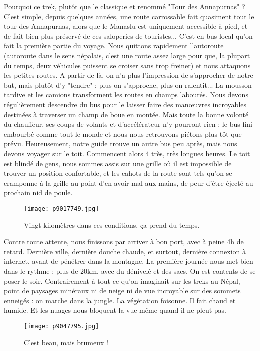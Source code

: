 \documentclass{book}
\begin{document}
Pourquoi ce trek, plutôt que le classique et renommé "Tour des Annapurnas" ? C'est simple, depuis quelques années, une route carrossable fait quasiment tout le tour des Annapurnas, alors que le Manaslu est uniquement accessible à pied, et de fait bien plus préservé de ces saloperies de touristes... C'est en bus local qu'on fait la première partie du voyage. Nous quittons rapidement l'autoroute (autoroute dans le sens népalais, c'est une route assez large pour que, la plupart du temps, deux véhicules puissent se croiser sans trop freiner) et nous attaquons les petites routes. A partir de là, on n'a plus l'impression de s'approcher de notre but, mais plutôt d'y "tendre" : plus on s'approche, plus on ralentit... La mousson tardive et les camions transforment les routes en champs labourés. Nous devons régulièrement descendre du bus pour le laisser faire des manœuvres incroyables destinées à traverser un champ de boue en montée. Mais toute la bonne volonté du chauffeur, ses coups de volants et d'accélérateur n'y pourront rien : le bus fini embourbé comme tout le monde et nous nous retrouvons piétons plus tôt que prévu. Heureusement, notre guide trouve un autre bus peu après, mais nous devons voyager sur le toit. Commencent alors 4 très, très longues heures. Le toit est blindé de gens, nous sommes assis sur une grille où il est impossible de trouver un position confortable, et les cahots de la route sont tels qu'on se cramponne à la grille au point d'en avoir mal aux mains, de peur d'être éjecté au prochain nid de poule.


\begin{figure}[h]
\centering
\texttt{[image: p9017749.jpg]}
\caption*{Vingt kilomètres dans ces conditions, ça prend du temps.}
\end{figure}

Contre toute attente, nous finissons par arriver à bon port, avec à peine 4h de retard. Dernière ville, dernière douche chaude, et surtout, dernière connexion à internet, avant de pénétrer dans la montagne. La première journée nous met bien dans le rythme : plus de 20km, avec du dénivelé et des sacs. On est contents de se poser le soir. Contrairement à tout ce qu'on imaginait sur les treks au Népal, point de paysages minéraux ni de neige ni de vue incroyable sur des sommets enneigés : on marche dans la jungle. La végétation foisonne. Il fait chaud et humide. Et les nuages nous bloquent la vue même quand il ne pleut pas.


\begin{figure}[h]
\centering
\texttt{[image: p9047795.jpg]}
\caption*{C'est beau, mais brumeux !}
\end{figure}
\end{document}
